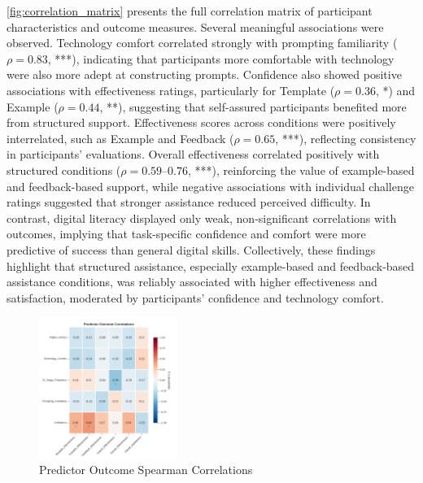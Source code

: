 \autoref{fig:correlation_matrix} presents the full correlation matrix of participant characteristics and outcome measures. Several meaningful associations were observed. Technology comfort correlated strongly with prompting familiarity ($\rho = 0.83$, ***), indicating that participants more comfortable with technology were also more adept at constructing prompts. Confidence also showed positive associations with effectiveness ratings, particularly for Template ($\rho = 0.36$, *) and Example ($\rho = 0.44$, **), suggesting that self-assured participants benefited more from structured support. Effectiveness scores across conditions were positively interrelated, such as Example and Feedback ($\rho = 0.65$, ***), reflecting consistency in participants' evaluations. Overall effectiveness correlated positively with structured conditions ($\rho = 0.59–0.76$, ***), reinforcing the value of example-based and feedback-based support, while negative associations with individual challenge ratings suggested that stronger assistance reduced perceived difficulty. In contrast, digital literacy displayed only weak, non-significant correlations with outcomes, implying that task-specific confidence and comfort were more predictive of success than general digital skills. Collectively, these findings highlight that structured assistance, especially example-based and feedback-based assistance conditions, was reliably associated with higher effectiveness and satisfaction, moderated by participants' confidence and technology comfort.

\begin{figure}[h]
\centering
\includegraphics[width=0.4\textwidth]{figures/10.png}
\caption{Predictor Outcome Spearman Correlations}
\label{fig:predictor_outcome}
\end{figure}

